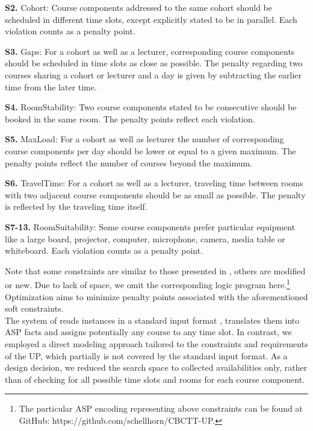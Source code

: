 \documentclass{easychair}
\newcommand{\UP}{UP}
\newcommand{\ASP}{ASP}
\begin{document}
  \textbf{S2.} Cohort: Course components addressed to the same cohort should be scheduled in different time slots, except explicitly stated to be in parallel. Each violation counts as a penalty point. 

  \textbf{S3.} Gaps: For a cohort as well as a lecturer, corresponding course components should be scheduled in time slots as close as possible. The penalty regarding two courses sharing a cohort or lecturer and a day is given by subtracting the earlier time from the later time. 

  \textbf{S4.} RoomStability: Two course components stated to be consecutive should be booked in the same room. The penalty points reflect each violation. 

  \textbf{S5.} MaxLoad: For a cohort as well as lecturer the number of corresponding course components per day should be lower or equal to a given maximum. The penalty points reflect the number of courses beyond the maximum. 

  \textbf{S6.} TravelTime: For a cohort as well as a lecturer, traveling time between rooms with two adjacent course components should be as small as possible. The penalty is reflected by the traveling time itself. 

  \textbf{S7-13.} RoomSuitability: Some course components prefer particular equipment like a large board, projector, computer, microphone, camera, media table or whiteboard. Each violation counts as a penalty point. 

  Note that some constraints are similar to those presented in \cite{bainkaokscsotawa18a}, others are modified or new.
  Due to lack of space, we omit the corresponding logic program here.\footnote{The particular \ASP{} encoding representing above constraints can be found at GitHub: https://github.com/schellhorn/CBCTT-UP.} 
  Optimization aims to minimize penalty points associated with the aforementioned soft constraints. \\
  The system of \cite{bainkaokscsotawa18a} reads instances in a standard input format \cite{bocegasc12a}, translates them into \ASP{} facts and assigns potentially any course to any time slot. 
  In contrast, we employed a direct modeling approach tailored to the constraints and requirements of the \UP{}, which partially is not covered by the standard input format. 
  As a design decision, we reduced the search space to collected availabilities only, rather than of checking for all possible time slots and rooms for each course component.
\end{document}
